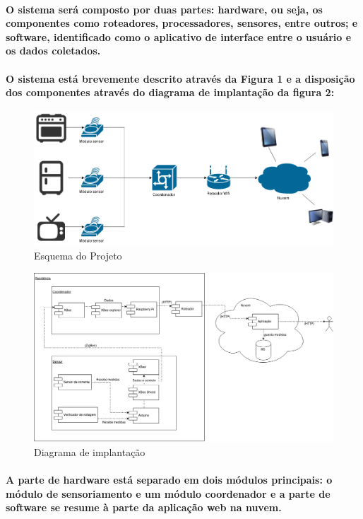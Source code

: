 \label{Cap:especificacao}
\paragraph{
	O sistema será composto por duas partes: hardware, ou seja, os componentes como roteadores, processadores, sensores, entre outros; e software, identificado como o aplicativo de interface entre o usuário e os dados coletados.
}
\paragraph{
	O sistema está brevemente descrito através da Figura 1 e a disposição dos componentes através do diagrama de implantação da figura 2:
}
\begin{figure}
\centering
\includegraphics[width=1\textwidth]{figuras/esqueminha.png}
\caption{\label{fig:esqueminha} Esquema do Projeto}
\end{figure}

\begin{figure}
\centering
\includegraphics[width=1\textwidth]{figuras/diagrama_implantacao.png}
\caption{\label{fig:diagrama_implantacao} Diagrama de implantação}
\end{figure}
\paragraph{
	A parte de hardware está separado em dois módulos principais: o módulo de sensoriamento e um módulo coordenador e a parte de software se resume à parte da aplicação web na nuvem.
}


